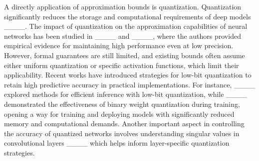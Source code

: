 	
	
	
	A directly  application of approximation bounds is quantization.  Quantization significantly reduces the storage and computational requirements of deep models ____. The impact of quantization on the approximation capabilities of neural networks has been studied in ____ and ____, where the authors provided empirical evidence for maintaining high performance even at low precision. However, formal guarantees are still limited, and existing bounds often assume either uniform quantization or specific activation functions, which limit their applicability. Recent works have introduced strategies for low-bit quantization to retain high predictive accuracy in practical implementations. For instance, ____ explored methods for efficient inference with low-bit quantization, while ____ demonstrated the effectiveness of binary weight quantization during training, opening a way for training and deploying models with significantly reduced memory and computational demands. Another important aspect in controlling the accuracy of quantized networks involves understanding singular values in convolutional layers  ____ which helps inform layer-specific quantization strategies.